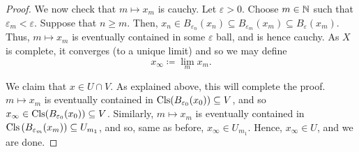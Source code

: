 \begin{thm}
\begin{proof}
We now check that $m\mapsto x_m$ is cauchy.  Let $\varepsilon >0$.  Choose $m\in \mathbb{N}$ such that $\varepsilon _m<\varepsilon$.  Suppose that $n\geq m$.  Then, $x_n\in B_{\varepsilon _n}(x_n)\subseteq B_{\varepsilon _m}(x_m)\subseteq B_{\varepsilon}(x_m)$.  Thus, $m\mapsto x_m$ is eventually contained in some $\varepsilon$ ball, and is hence cauchy.  As $X$ is complete, it converges (to a unique limit) and so we may define
\begin{equation}
x_\infty \coloneqq \lim _mx_m.
\end{equation}

We claim that $x\in U\cap V$.  As explained above, this will complete the proof.  $m\mapsto x_m$ is eventually contained in $\operatorname{Cls} (B_{\varepsilon _0}(x_0))\subseteq V$, and so $x_\infty \in \operatorname{Cls} (B_{\varepsilon _0}(x_0))\subseteq V$.  Similarly, $m\mapsto x_m$ is eventually contained in $\operatorname{Cls} \left( B_{\varepsilon _m}(x_m)\right) \subseteq U_{m_1}$, and so, same as before, $x_\infty \in U_{m_1}$.  Hence, $x_\infty \in U$, and we are done.
\end{proof}
\end{thm}

